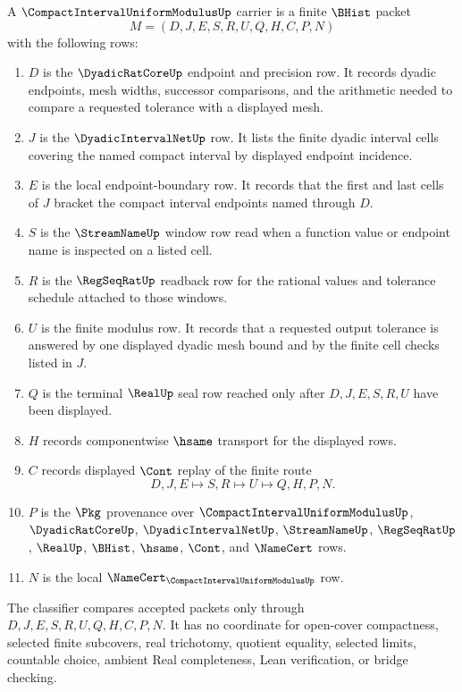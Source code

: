 \begin{definition}\label{def:compact-interval-uniform-modulus-carrier}
A $\CompactIntervalUniformModulusUp$ carrier is a finite $\BHist$ packet
$$
M=(D,J,E,S,R,U,Q,H,C,P,N)
$$
with the following rows:
\begin{enumerate}
\item $D$ is the $\DyadicRatCoreUp$ endpoint and precision row. It records dyadic endpoints, mesh widths, successor comparisons, and the arithmetic needed to compare a requested tolerance with a displayed mesh.
\item $J$ is the $\DyadicIntervalNetUp$ row. It lists the finite dyadic interval cells covering the named compact interval by displayed endpoint incidence.
\item $E$ is the local endpoint-boundary row. It records that the first and last cells of $J$ bracket the compact interval endpoints named through $D$.
\item $S$ is the $\StreamNameUp$ window row read when a function value or endpoint name is inspected on a listed cell.
\item $R$ is the $\RegSeqRatUp$ readback row for the rational values and tolerance schedule attached to those windows.
\item $U$ is the finite modulus row. It records that a requested output tolerance is answered by one displayed dyadic mesh bound and by the finite cell checks listed in $J$.
\item $Q$ is the terminal $\RealUp$ seal row reached only after $D,J,E,S,R,U$ have been displayed.
\item $H$ records componentwise $\hsame$ transport for the displayed rows.
\item $C$ records displayed $\Cont$ replay of the finite route
$$
D,J,E \longmapsto S,R \longmapsto U \longmapsto Q,H,P,N .
$$
\item $P$ is the $\Pkg$ provenance over $\CompactIntervalUniformModulusUp$, $\DyadicRatCoreUp$, $\DyadicIntervalNetUp$, $\StreamNameUp$, $\RegSeqRatUp$, $\RealUp$, $\BHist$, $\hsame$, $\Cont$, and $\NameCert$ rows.
\item $N$ is the local $\NameCert_{\CompactIntervalUniformModulusUp}$ row.
\end{enumerate}
The classifier compares accepted packets only through $D,J,E,S,R,U,Q,H,C,P,N$. It has no coordinate for open-cover compactness, selected finite subcovers, real trichotomy, quotient equality, selected limits, countable choice, ambient Real completeness, Lean verification, or bridge checking.
\end{definition}

